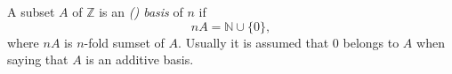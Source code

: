 \documentclass[12pt]{article}
\begin{document}
A subset $A$ of $\mathbb{Z}$ is an \emph{() basis} of  $n$ if
\begin{equation*}
nA=\mathbb{N}\cup\{0\},
\end{equation*}
where $nA$ is $n$-fold sumset of $A$. Usually it is assumed that $0$ belongs to $A$ when saying that $A$ is an additive basis.
\end{document}
